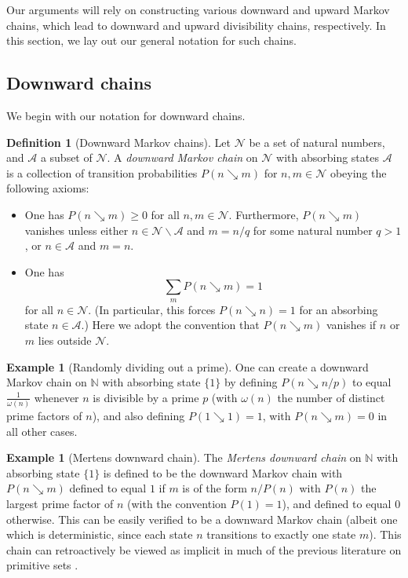 \documentclass[12pt]{amsart}
\theoremstyle{definition}
\newtheorem{definition}[theorem]{Definition}
\newtheorem{example}[theorem]{Example}
\theoremstyle{remark}
\numberwithin{equation}{section}
\newcommand{\N}{{\mathbb N}}
\newcommand{\1}{{\mathbf 1}}
\begin{document}
Our arguments will rely on constructing various downward and upward Markov chains, which lead to downward and upward divisibility chains, respectively.  In this section, we lay out our general notation for such chains.

\subsection{Downward chains}

We begin with our notation for downward chains.

\begin{definition}[Downward Markov chains]\label{down-markov}  
Let ${\mathcal N}$ be a set of natural numbers, and ${\mathcal A}$ a subset of ${\mathcal N}$.  A \emph{downward Markov chain} on ${\mathcal N}$ with absorbing states ${\mathcal A}$ is a collection of transition probabilities $P(n \searrow m)$ for $n,m \in {\mathcal N}$ obeying the following axioms:
\begin{itemize}
    \item[(i)] One has $P(n \searrow m) \geq 0$ for all $n,m \in {\mathcal N}$.  Furthermore, $P(n \searrow m)$ vanishes unless either $n \in {\mathcal N} \backslash {\mathcal A}$ and $m = n/q$ for some natural number $q > 1$, or $n \in {\mathcal A}$ and $m=n$.
    \item[(ii)]  One has
\begin{equation}\label{searrow}
\sum_m P(n \searrow m) = 1
\end{equation}
    for all $n \in {\mathcal N}$.  (In particular, this forces $P(n \searrow n) = 1$ for an absorbing state $n \in {\mathcal A}$.)  Here we adopt the convention that $P(n \searrow m)$ vanishes if $n$ or $m$ lies outside ${\mathcal N}$.
\end{itemize}
\end{definition}

\begin{example}[Randomly dividing out a prime]\label{Random} One can create a downward Markov chain on $\N$ with absorbing state $\{1\}$ by defining $P(n \searrow n/p)$ to equal $\frac{1}{\omega(n)}$ whenever $n$ is divisible by a prime $p$ (with $\omega(n)$ the number of distinct prime factors of $n$), and also defining $P(1 \searrow 1) = 1$, with $P(n \searrow m) = 0$ in all other cases.
\end{example}

\begin{example}[Mertens downward chain]\label{mertens}  The \emph{Mertens downward chain} on $\N$ with absorbing state $\{1\}$ is defined to be the downward Markov chain with $P(n \searrow m)$ defined to equal $1$ if $m$ is of the form $n/P(n)$ with $P(n)$ the largest prime factor of $n$ (with the convention $P(1)=1$), and defined to equal $0$ otherwise.  This can be easily verified to be a downward Markov chain (albeit one which is deterministic, since each state $n$ transitions to exactly one state $m$).  This chain can retroactively be viewed as implicit in much of the previous literature on primitive sets \cite{erdos35,LP, Lichtman, Lalmost,glw}.
\end{example}
\end{document}
